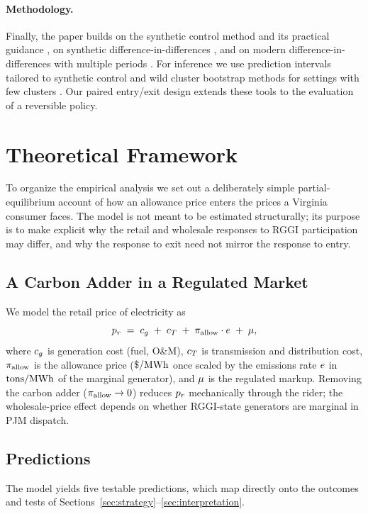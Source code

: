 \documentclass[12pt]{article}
\begin{document}
\paragraph{Methodology.} Finally, the paper builds on the synthetic control method
\citep{Abadie2010_synth,Abadie2015_comparative} and its practical guidance
\citep{Abadie2021_using_synth}, on synthetic difference-in-differences
\citep{Arkhangelsky2021_sdid}, and on modern difference-in-differences with multiple periods
\citep{Callaway2021_did}. For inference we use prediction intervals tailored to synthetic
control \citep{Cattaneo2021_prediction} and wild cluster bootstrap methods for settings with
few clusters \citep{Cameron2008_bootstrap}. Our paired entry/exit design extends these tools
to the evaluation of a reversible policy.

\section{Theoretical Framework}\label{sec:theory}
To organize the empirical analysis we set out a deliberately simple partial-equilibrium
account of how an allowance price enters the prices a Virginia consumer faces. The model is
not meant to be estimated structurally; its purpose is to make explicit why the retail and
wholesale responses to RGGI participation may differ, and why the response to exit need not
mirror the response to entry.

\subsection{A Carbon Adder in a Regulated Market}\label{sec:model}
We model the retail price of electricity as
\begin{equation}\label{eq:retail}
  p_{r} \;=\; c_{g} \;+\; c_{T} \;+\; \pi_{\text{allow}} \cdot e \;+\; \mu,
\end{equation}
where $c_{g}$ is generation cost (fuel, O\&M), $c_{T}$ is transmission and distribution
cost, $\pi_{\text{allow}}$ is the allowance price ($\$/\mathrm{MWh}$ once scaled by the emissions rate
$e$ in $\mathrm{tons}/\mathrm{MWh}$ of the marginal generator), and $\mu$ is the regulated markup.
Removing the carbon adder ($\pi_{\text{allow}} \to 0$) reduces $p_{r}$ mechanically through the
rider; the wholesale-price effect depends on whether RGGI-state generators are marginal in
PJM dispatch.

\subsection{Predictions}\label{sec:predictions}
The model yields five testable predictions, which map directly onto the outcomes and tests of
Sections~\ref{sec:strategy}--\ref{sec:interpretation}.
\end{document}
